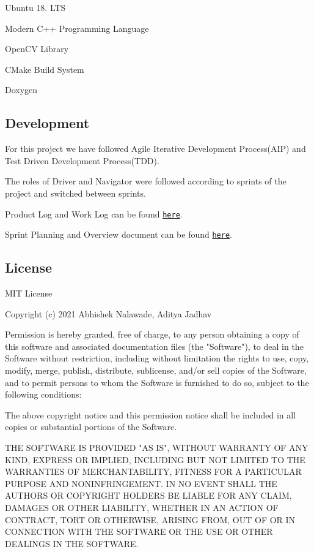 \begin{DoxyItemize}
\item Ubuntu 18. L\+TS
\item Modern C++ Programming Language
\item Open\+CV Library
\item C\+Make Build System
\item Doxygen
\end{DoxyItemize}

\subsection*{Development}


\begin{DoxyItemize}
\item For this project we have followed Agile Iterative Development Process(\+A\+I\+P) and Test Driven Development Process(\+T\+D\+D).
\item The roles of Driver and Navigator were followed according to sprints of the project and switched between sprints.
\item Product Log and Work Log can be found \href{https://docs.google.com/spreadsheets/d/1bapR4zMCzfcwQHhxAm6KktWsMINTTPEt/edit#gid=2052063551}{\tt here}.
\item Sprint Planning and Overview document can be found \href{https://docs.google.com/document/d/1Xaz2rZ7OrmSh3bSE351XQz483VGetJkJdF37AjUF9Ro/edit}{\tt here}.
\end{DoxyItemize}

\subsection*{License}


\begin{DoxyCode}
MIT License

Copyright (c) 2021 Abhishek Nalawade, Aditya Jadhav

Permission is hereby granted, free of charge, to any person obtaining a copy
of this software and associated documentation files (the "Software"), to deal
in the Software without restriction, including without limitation the rights
to use, copy, modify, merge, publish, distribute, sublicense, and/or sell
copies of the Software, and to permit persons to whom the Software is
furnished to do so, subject to the following conditions:

The above copyright notice and this permission notice shall be included in all
copies or substantial portions of the Software.

THE SOFTWARE IS PROVIDED "AS IS", WITHOUT WARRANTY OF ANY KIND, EXPRESS OR
IMPLIED, INCLUDING BUT NOT LIMITED TO THE WARRANTIES OF MERCHANTABILITY,
FITNESS FOR A PARTICULAR PURPOSE AND NONINFRINGEMENT. IN NO EVENT SHALL THE
AUTHORS OR COPYRIGHT HOLDERS BE LIABLE FOR ANY CLAIM, DAMAGES OR OTHER
LIABILITY, WHETHER IN AN ACTION OF CONTRACT, TORT OR OTHERWISE, ARISING FROM,
OUT OF OR IN CONNECTION WITH THE SOFTWARE OR THE USE OR OTHER DEALINGS IN THE 
SOFTWARE.
\end{DoxyCode}


